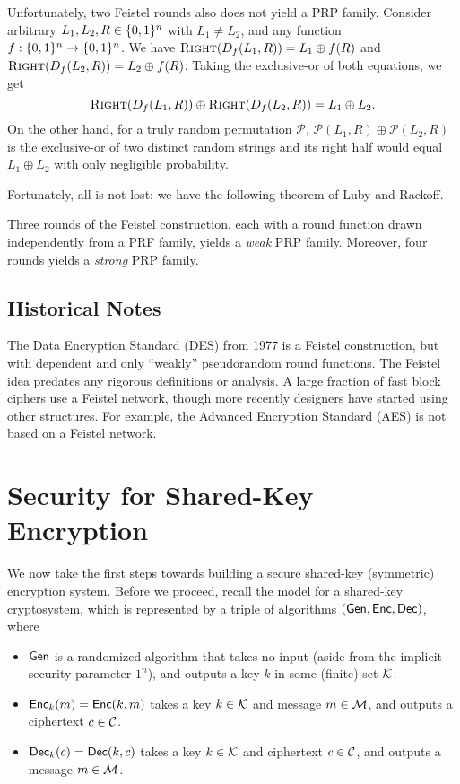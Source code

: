 \documentclass[11pt]{article}
\begin{document}
Unfortunately, two Feistel rounds also does not yield a PRP family.
Consider arbitrary $L_1, L_2, R \in \{0,1\}^n$ with $L_{1} \neq L_{2}$,
and any function $f : \{0,1\}^n \rightarrow \{0,1\}^n$.  We have
$\textsc{Right}( D_f(L_1,R) ) = L_1\oplus f(R) $ and
$\textsc{Right}(D_f(L_2,R) ) = L_2\oplus f(R)$.  Taking the
exclusive-or of both equations, we get \[ \textsc{Right}( D_f(L_1,R))
\oplus \textsc{Right}( D_f(L_2,R)) = L_1 \oplus L_2. \] On the other
hand, for a truly random permutation $\mathcal P$, $\mathcal P(L_1,R)
\oplus \mathcal P(L_2, R)$ is the exclusive-or of two distinct random
strings and its right half would equal $L_1\oplus L_2$ with only
negligible probability.

Fortunately, all is not lost: we have the following theorem of Luby
and Rackoff.

\begin{theorem}
  \label{thm:luby-rackoff}
  Three rounds of the Feistel construction, each with a round function
  drawn independently from a  PRF family, yields a \emph{weak} PRP
  family.  Moreover, four rounds yields a \emph{strong} PRP family.
\end{theorem}

\subsection{Historical Notes}
\label{sec:historical-notes}

The Data Encryption Standard (DES) from 1977 is a Feistel
construction, but with dependent and only ``weakly'' pseudorandom
round functions.  The Feistel idea predates any rigorous definitions
or analysis.  A large fraction of fast block ciphers use a Feistel
network, though more recently designers have started using other
structures.  For example, the Advanced Encryption Standard (AES) is
not based on a Feistel network.

\section{Security for Shared-Key Encryption}
\label{sec:security-shared-key}

We now take the first steps towards building a secure shared-key
(symmetric) encryption system.  Before we proceed, recall the model
for a shared-key cryptosystem, which is represented by a triple of
algorithms $(\mathsf{Gen}, \mathsf{Enc},\mathsf{Dec})$, where
\begin{itemize}
\item $\mathsf{Gen}$ is a randomized algorithm that takes no input (aside
  from the implicit security parameter $1^{n}$), and outputs a key $k$
  in some (finite) set $\mathcal{K}$.
\item $\mathsf{Enc}_k(m) = \mathsf{Enc}(k,m)$ takes a key $k \in \mathcal{K}$ and
  message $m \in \mathcal{M}$, and outputs a ciphertext $c \in
  \mathcal{C}$.
\item $\mathsf{Dec}_k(c) = \mathsf{Dec}(k, c)$ takes a key $k \in \mathcal{K}$ and
  ciphertext $c \in \mathcal{C}$, and outputs a message $m \in
  \mathcal{M}$.
\end{itemize}
\end{document}
